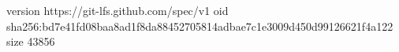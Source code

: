 version https://git-lfs.github.com/spec/v1
oid sha256:bd7e41fd08baa8ad1f8da88452705814adbae7c1e3009d450d99126621f4a122
size 43856
